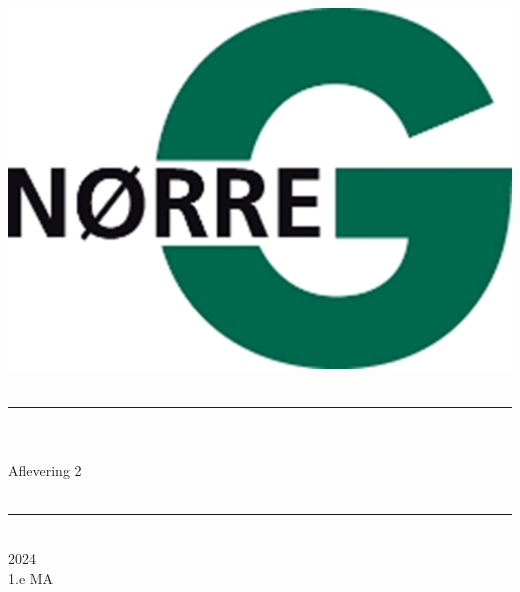 \documentclass[12pt,x11names,a4paper]{article}
\begin{document}
%

\begin{titlepage}

\begin{minipage}{0.27\textwidth}

\end{minipage}
\begin{minipage}{0.73\textwidth}
\begin{center}
\phantom{h} \vspace{1cm}\\
\hspace{4cm}
\includegraphics[scale = 1]{Billeder/Norreg.png} \\
\phantom{h} \vspace{5cm}\\
\rule{0.7\textwidth}{0.3mm}\\
\phantom{h}\\
{\fontsize{50}{60}\selectfont Aflevering 2}\\
\phantom{h}\\
\rule{0.7\textwidth}{0.3mm}\\
\Large 2024\\
\Large 1.e MA

\end{center}
\end{minipage}
\end{titlepage}
\end{document}
